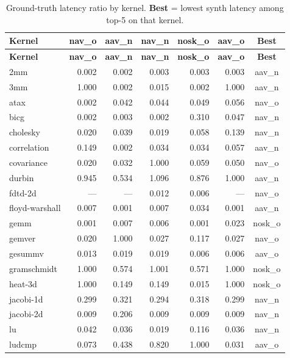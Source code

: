 \documentclass[11pt]{article}
\begin{document}
{\footnotesize
\setlength{\tabcolsep}{3pt}
\begin{longtable}{@{}L{1.6cm} r r r r r c@{}}
\caption{Ground-truth latency ratio by kernel. \textbf{Best} = lowest synth latency among top-5 on that kernel.} \\
\toprule
\textbf{Kernel} & \textbf{nav\_o} & \textbf{aav\_n} & \textbf{nav\_n} & \textbf{nosk\_o} & \textbf{aav\_o} & \textbf{Best} \\
\midrule
\endfirsthead
\toprule
\textbf{Kernel} & \textbf{nav\_o} & \textbf{aav\_n} & \textbf{nav\_n} & \textbf{nosk\_o} & \textbf{aav\_o} & \textbf{Best} \\
\midrule
\endhead
  2mm & 0.002 & 0.002 & 0.003 & 0.003 & 0.003 & aav\_n \\
  3mm & 1.000 & 0.002 & 0.015 & 0.002 & 1.000 & aav\_n \\
  atax & 0.002 & 0.042 & 0.044 & 0.049 & 0.056 & nav\_o \\
  bicg & 0.002 & 0.003 & 0.002 & 0.310 & 0.047 & nav\_n \\
  cholesky & 0.020 & 0.039 & 0.019 & 0.058 & 0.139 & nav\_n \\
  correlation & 0.149 & 0.002 & 0.034 & 0.034 & 0.057 & aav\_n \\
  covariance & 0.020 & 0.032 & 1.000 & 0.059 & 0.050 & nav\_o \\
  durbin & 0.945 & 0.534 & 1.096 & 0.876 & 1.000 & aav\_n \\
  fdtd-2d & --- & --- & 0.012 & 0.006 & --- & nav\_o \\
  floyd-warshall & 0.007 & 0.001 & 0.007 & 0.034 & 0.001 & aav\_n \\
  gemm & 0.001 & 0.007 & 0.006 & 0.001 & 0.023 & nosk\_o \\
  gemver & 0.020 & 1.000 & 0.027 & 0.117 & 0.027 & nav\_o \\
  gesummv & 0.013 & 0.019 & 0.019 & 0.006 & 0.006 & aav\_o \\
  gramschmidt & 1.000 & 0.574 & 1.001 & 0.571 & 1.000 & nosk\_o \\
  heat-3d & 1.000 & 0.149 & 0.149 & 0.015 & 1.000 & nosk\_o \\
  jacobi-1d & 0.299 & 0.321 & 0.294 & 0.318 & 0.299 & nav\_n \\
  jacobi-2d & 0.009 & 0.206 & 0.009 & 0.009 & 0.009 & nav\_n \\
  lu & 0.042 & 0.036 & 0.019 & 0.116 & 0.036 & nav\_n \\
  ludcmp & 0.073 & 0.438 & 0.820 & 1.000 & 0.031 & aav\_o \\

\end{longtable}}
\end{document}

